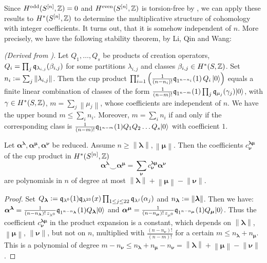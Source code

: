 Since $H^\text{odd}(S^{[n]},\mathbb{Z}) = 0$ and $H^\text{even}(S^{[n]},\mathbb{Z})$ is torsion-free by \cite{Markman}, we can apply these results to $H^\ast(S^{[n]}, \mathbb{Z})$ to determine the multiplicative structure of cohomology with integer coefficients. It turns out, that it is somehow independent of $n$. More precisely, we have the following stability theorem, by Li, Qin and Wang:
\begin{theorem} \label{stability}\emph{(Derived from \cite[Thm.~2.1]{QinWang}).}
Let $Q_1,\ldots,Q_s$ be products of creation operators, \ie $Q_i = \prod_j \mathfrak{q}_{\lambda_{i,j}}(\beta_{i,j}) $ for some partitions $\lambda_{i,j}$ and classes $\beta_{i,j}\in H^\ast(S,\mathbb{Z})$. Set $n_i \vcentcolon=  \sum_j \left\|\lambda_{i,j}\right\|$.
Then the cup product 
$ \prod_{i=1}^s \left(\frac{1}{(n-n_i)!} \mathfrak{q}_{1^{n-n_i}}(1) \,Q_i \,|0\rangle \right)$ equals a finite linear combination of classes of the form $\frac{1}{(n-m)!}\mathfrak{q}_{1^{n-m}}(1)\prod_j \mathfrak{q}_{\mu_{j}}(\gamma_{j})|0\rangle$, with $\gamma\in H^\ast(S,\mathbb{Z})$, $m=\sum_j\left\|\mu_j\right\|$, whose coefficients are independent of $n$. We have the upper bound $m\leq\sum_i n_i$. Moreover, $m=\sum_i n_i$ if and only if the corresponding class is $\frac{1}{(n-m)!}\mathfrak{q}_{1^{n-m}}(1)Q_1Q_2\ldots Q_s|0\rangle$ with coefficient $1$.
\end{theorem}
\begin{corollary} \label{stabCor} Let $\boldsymbol{\alpha}^{\boldsymbol{\lambda}},\boldsymbol{\alpha}^{\boldsymbol{\mu}},\boldsymbol{\alpha}^{\boldsymbol{\nu}}$ be reduced. Assume $n\geq\left\|\boldsymbol\lambda\right\|,\left\|\boldsymbol\mu\right\| $. Then the coefficients $c^{\boldsymbol{\lambda\mu}}_{\boldsymbol{\nu}}$ of the cup product in $H^\ast(S^{[n]},\mathbb{Z})$
$$\boldsymbol{\alpha}^{\boldsymbol{\lambda}} \smile
\boldsymbol{\alpha}^{\boldsymbol{\mu}}
= \sum_{\boldsymbol{\nu}} c^{\boldsymbol{\lambda\mu}}_{\boldsymbol{\nu}} \boldsymbol{\alpha}^{\boldsymbol{\nu}}
$$  
are polynomials in $n$ of degree at most $ \left\|\boldsymbol\lambda\right\|+\left\|\boldsymbol\mu\right\|-\left\|\boldsymbol\nu\right\|$.
\end{corollary}
\begin{proof} Set $Q_{\boldsymbol{\lambda}}\vcentcolon=   \mathfrak{q}_{\lambda^0}(1)\mathfrak{q}_{\lambda^{23}}(x)\prod_{1\leq j\leq 22}\mathfrak{q}_{\lambda^j}(\alpha_j)$ and $n_{\boldsymbol\lambda}\vcentcolon= \left\|\boldsymbol\lambda\right\|$. Then we have:
$\boldsymbol{\alpha}^{\boldsymbol{\lambda}} = \frac{1}{(n-n_{\boldsymbol\lambda})!\,z_{\lambda^0}}\mathfrak{q}_{1^{n-n_{\boldsymbol\lambda}}}(1)Q_{\boldsymbol\lambda}|0\rangle$ and $
\boldsymbol{\alpha}^{\boldsymbol{\mu}}=\frac{1}{(n-n_{\boldsymbol\mu})!\,z_{\mu^0}}\mathfrak{q}_{1^{n-n_{\boldsymbol\mu}}}(1)Q_{\boldsymbol\mu}|0\rangle $. 
Thus the coefficient $c^{\boldsymbol{\lambda\mu}}_{\boldsymbol{\nu}}$ in the product expansion is a constant, which depends on $ \left\|\boldsymbol\lambda\right\|$, $\left\|\boldsymbol\mu\right\|$, $\left\|\boldsymbol\nu\right\|$, but not on $n$, multiplied with $\frac{(n-n_{\boldsymbol\nu})!}{(n-m)!}$ for a certain $m\leq n_{\boldsymbol\lambda}+n_{\boldsymbol\mu}$. 
This is a polynomial of degree $m-n_{\boldsymbol\nu}\leq n_{\boldsymbol\lambda}+n_{\boldsymbol\mu}-n_{\boldsymbol\nu} =\left\|\boldsymbol\lambda\right\|+\left\|\boldsymbol\mu\right\|-\left\|\boldsymbol\nu\right\| $.
\end{proof}
